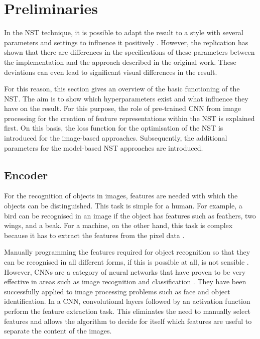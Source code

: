 \section{Preliminaries} \label{sec:preliminaries}
In the \gls{NST} technique, it is possible to adapt the result to a style with several parameters and settings to influence it positively \cite{GEB2016}. However, the replication has shown that there are differences in the specifications of these parameters between the implementation and the approach described in the original work. These deviations can even lead to significant visual differences in the result. 

For this reason, this section gives an overview of the basic functioning of the \gls{NST}. The aim is to show which hyperparameters exist and what influence they have on the result. For this purpose, the role of pre-trained \gls{CNN} from image processing for the creation of feature representations within the \gls{NST} is explained first. On this basis, the loss function for the optimisation of the \gls{NST} is introduced for the image-based approaches. Subsequently, the additional parameters for the model-based \gls{NST} approaches are introduced. 

\subsection{Encoder} \label{sec:encoder}
For the recognition of objects in images, features are needed with which the objects can be distinguished. This task is simple for a human. For example, a bird can be recognised in an image if the object has features such as feathers, two wings, and a beak. For a machine, on the other hand, this task is complex because it has to extract the features from the pixel data \cite{Alp2020}. 

Manually programming the features required for object recognition so that they can be recognised in all different forms, if this is possible at all, is not sensible \cite{Alp2020}. However, \glspl{CNN} are a category of neural networks that have proven to be very effective in areas such as image recognition and classification \cite{SZ2015,He2016}. They have been successfully applied to image processing problems such as face and object identification. In a \gls{CNN}, convolutional layers followed by an activation function perform the feature extraction task. This eliminates the need to manually select features and allows the algorithm to decide for itself which features are useful to separate the content of the images. 

